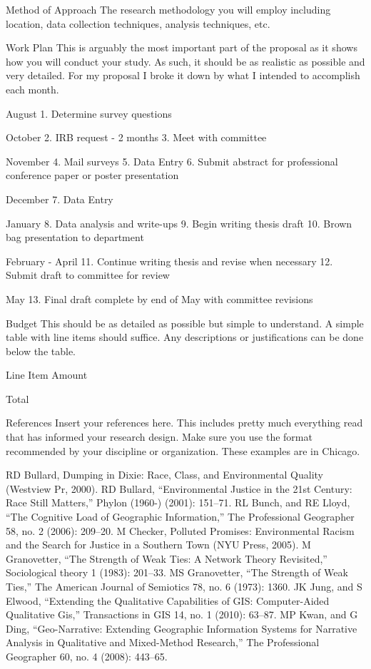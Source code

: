 \pagebreak 

Method of Approach
The research methodology you will employ including location, data collection techniques, analysis techniques, etc.

\pagebreak 

Work Plan
This is arguably the most important part of the proposal as it shows how you will conduct your study. As such, it should be as realistic as possible and very detailed. For my proposal I broke it down by what I intended to accomplish each month.

August
1. Determine survey questions

October
2. IRB request - 2 months
3. Meet with committee

November
4. Mail surveys
5. Data Entry
6. Submit abstract for professional conference paper or poster presentation

December
7. Data Entry

January
8. Data analysis and write-ups
9. Begin writing thesis draft
10. Brown bag presentation to department

February - April
11. Continue writing thesis and revise when necessary
12. Submit draft to committee for review 

May
13. Final draft complete by end of May with committee revisions

\pagebreak 

Budget
This should be as detailed as possible but simple to understand. A simple table with line items should suffice. Any descriptions or justifications can be done below the table.

Line Item
Amount

Total

\pagebreak 

References
Insert your references here. This includes pretty much everything read that has informed your research design. Make sure you use the format recommended by your discipline or organization. These examples are in Chicago.

RD Bullard, Dumping in Dixie: Race, Class, and Environmental Quality (Westview Pr, 2000).
RD Bullard, ``Environmental Justice in the 21st Century: Race Still Matters,'' Phylon (1960-) (2001): 151--71.
RL Bunch, and RE Lloyd, ``The Cognitive Load of Geographic Information,'' The Professional Geographer 58, no. 2 (2006): 209--20.
M Checker, Polluted Promises: Environmental Racism and the Search for Justice in a Southern Town (NYU Press, 2005).
M Granovetter, ``The Strength of Weak Ties: A Network Theory Revisited,'' Sociological theory 1 (1983): 201--33.
MS Granovetter, ``The Strength of Weak Ties,'' The American Journal of Semiotics 78, no. 6 (1973): 1360.
JK Jung, and S Elwood, ``Extending the Qualitative Capabilities of GIS: Computer-Aided Qualitative Gis,'' Transactions in GIS 14, no. 1 (2010): 63--87.
MP Kwan, and G Ding, ``Geo-Narrative: Extending Geographic Information Systems for Narrative Analysis in Qualitative and Mixed-Method Research,'' The Professional Geographer 60, no. 4 (2008): 443--65.




